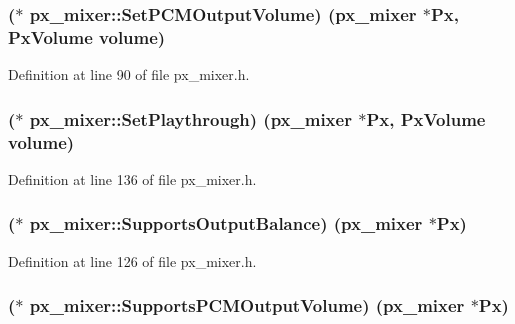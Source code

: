 \subsubsection[{\texorpdfstring{Set\+P\+C\+M\+Output\+Volume}{SetPCMOutputVolume}}]{($\ast$ px\+\_\+mixer\+::\+Set\+P\+C\+M\+Output\+Volume) ({\bf px\+\_\+mixer} $\ast$Px, {\bf Px\+Volume} volume)}\hypertarget{structpx__mixer_a4f1547e53c100ee9abf9556241b32b6b}{}\label{structpx__mixer_a4f1547e53c100ee9abf9556241b32b6b}


Definition at line 90 of file px\+\_\+mixer.\+h.

\subsubsection[{\texorpdfstring{Set\+Playthrough}{SetPlaythrough}}]{($\ast$ px\+\_\+mixer\+::\+Set\+Playthrough) ({\bf px\+\_\+mixer} $\ast$Px, {\bf Px\+Volume} volume)}\hypertarget{structpx__mixer_aa4632364a5928af13f0dda569dcd05b4}{}\label{structpx__mixer_aa4632364a5928af13f0dda569dcd05b4}


Definition at line 136 of file px\+\_\+mixer.\+h.

\subsubsection[{\texorpdfstring{Supports\+Output\+Balance}{SupportsOutputBalance}}]{($\ast$ px\+\_\+mixer\+::\+Supports\+Output\+Balance) ({\bf px\+\_\+mixer} $\ast$Px)}\hypertarget{structpx__mixer_a1dc7c73c8044cfd954e5489ea67a6a95}{}\label{structpx__mixer_a1dc7c73c8044cfd954e5489ea67a6a95}


Definition at line 126 of file px\+\_\+mixer.\+h.

\subsubsection[{\texorpdfstring{Supports\+P\+C\+M\+Output\+Volume}{SupportsPCMOutputVolume}}]{($\ast$ px\+\_\+mixer\+::\+Supports\+P\+C\+M\+Output\+Volume) ({\bf px\+\_\+mixer} $\ast$Px)}\hypertarget{structpx__mixer_a0c697c890767ec9b844672940d05f01d}{}\label{structpx__mixer_a0c697c890767ec9b844672940d05f01d}


